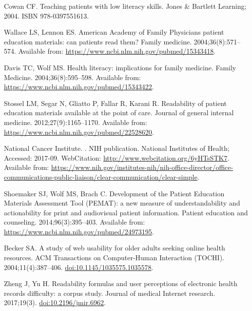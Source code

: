 \documentclass[10pt,a4paper]{article}
\begin{document}
\begin{thebibliography}{10}
	Cowan CF.
	\newblock Teaching patients with low literacy skills.
	\newblock Jones \& Bartlett Learning; 2004.
	\newblock ISBN 978-0397551613.
	
	Wallace LS, Lennon ES.
	\newblock American Academy of Family Physicians patient education materials:
	can patients read them?
	\newblock Family medicine. 2004;36(8):571--574.
	\newblock Available from: \url{https://www.ncbi.nlm.nih.gov/pubmed/15343418}.
	
	Davis TC, Wolf MS.
	\newblock Health literacy: implications for family medicine.
	\newblock Family Medicine. 2004;36(8):595--598.
	\newblock Available from: \url{https://www.ncbi.nlm.nih.gov/pubmed/15343422}.
	
	Stossel LM, Segar N, Gliatto P, Fallar R, Karani R.
	\newblock Readability of patient education materials available at the point of
	care.
	\newblock Journal of general internal medicine. 2012;27(9):1165--1170.
	\newblock Available from: \url{https://www.ncbi.nlm.nih.gov/pubmed/22528620}.
	
	{National Cancer Institute}.
	.
	\newblock NIH publication. National Institutes of Health; Accessed: 2017-09.
	WebCitation: \url{http://www.webcitation.org/6yHTsSTK7}.
	\newblock Available from:
	\url{https://www.nih.gov/institutes-nih/nih-office-director/office-communications-public-liaison/clear-communication/clear-simple}.
	
	Shoemaker SJ, Wolf MS, Brach C.
	\newblock Development of the Patient Education Materials Assessment Tool
	(PEMAT): a new measure of understandability and actionability for print and
	audiovisual patient information.
	\newblock Patient education and counseling. 2014;96(3):395--403.
	\newblock Available from: \url{https://www.ncbi.nlm.nih.gov/pubmed/24973195}.
	
	Becker SA.
	\newblock A study of web usability for older adults seeking online health
	resources.
	\newblock ACM Transactions on Computer-Human Interaction (TOCHI).
	2004;11(4):387--406.
	\newblock \href {http://dx.doi.org/10.1145/1035575.1035578}
	{doi:10.1145/1035575.1035578}.
	
	Zheng J, Yu H.
	\newblock Readability formulas and user perceptions of electronic health
	records difficulty: a corpus study.
	\newblock Journal of medical Internet research. 2017;19(3).
	\newblock \href {http://dx.doi.org/10.2196/jmir.6962} {doi:10.2196/jmir.6962}.
	

\end{thebibliography}
\end{document}
